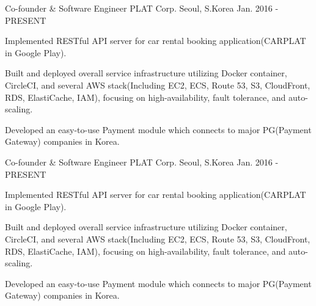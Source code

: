 

\begin{cventries}

  \cventry
    {Co-founder \& Software Engineer} %
    {PLAT Corp.} %
    {Seoul, S.Korea} %
    {Jan. 2016 - PRESENT} %
    {
      \begin{cvitems} %
        \item {Implemented RESTful API server for car rental booking application(CARPLAT in Google Play).}
        \item {Built and deployed overall service infrastructure utilizing Docker container, CircleCI, and several AWS stack(Including EC2, ECS, Route 53, S3, CloudFront, RDS, ElastiCache, IAM), focusing on high-availability, fault tolerance, and auto-scaling.}
        \item {Developed an easy-to-use Payment module which connects to major PG(Payment Gateway) companies in Korea.}
      \end{cvitems}
    }


  \cventry
    {Co-founder \& Software Engineer} %
    {PLAT Corp.} %
    {Seoul, S.Korea} %
    {Jan. 2016 - PRESENT} %
    {
      \begin{cvitems} %
        \item {Implemented RESTful API server for car rental booking application(CARPLAT in Google Play).}
        \item {Built and deployed overall service infrastructure utilizing Docker container, CircleCI, and several AWS stack(Including EC2, ECS, Route 53, S3, CloudFront, RDS, ElastiCache, IAM), focusing on high-availability, fault tolerance, and auto-scaling.}
        \item {Developed an easy-to-use Payment module which connects to major PG(Payment Gateway) companies in Korea.}
      \end{cvitems}
    }


\end{cventries}
